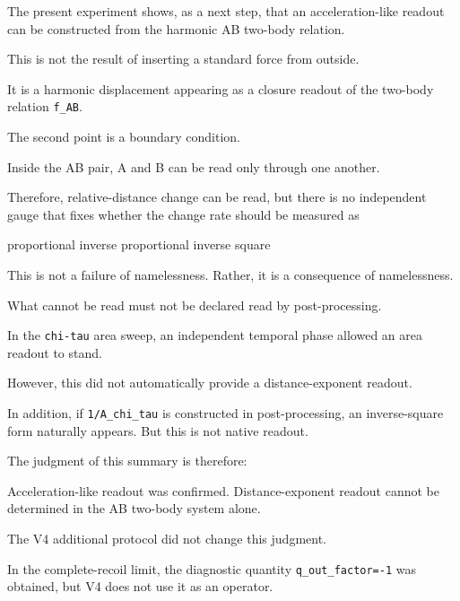 \documentclass[
]{article}
\newenvironment{Shaded}{}{}
\newcommand{\NormalTok}[1]{#1}
\begin{document}
The present experiment shows, as a next step, that an acceleration-like
readout can be constructed from the harmonic AB two-body relation.

This is not the result of inserting a standard force from outside.

It is a harmonic displacement appearing as a closure readout of the
two-body relation \texttt{f\_AB}.

The second point is a boundary condition.

Inside the AB pair, A and B can be read only through one another.

Therefore, relative-distance change can be read, but there is no
independent gauge that fixes whether the change rate should be measured
as

\begin{Shaded}
\begin{Highlighting}[]
\NormalTok{proportional}
\NormalTok{inverse proportional}
\NormalTok{inverse square}
\end{Highlighting}
\end{Shaded}

This is not a failure of namelessness. Rather, it is a consequence of
namelessness.

What cannot be read must not be declared read by post-processing.

In the \texttt{chi-tau} area sweep, an independent temporal phase
allowed an area readout to stand.

However, this did not automatically provide a distance-exponent readout.

In addition, if \texttt{1/A\_chi\_tau} is constructed in
post-processing, an inverse-square form naturally appears. But this is
not native readout.

The judgment of this summary is therefore:

\begin{Shaded}
\begin{Highlighting}[]
\NormalTok{Acceleration{-}like readout was confirmed.}
\NormalTok{Distance{-}exponent readout cannot be determined in the AB two{-}body system alone.}
\end{Highlighting}
\end{Shaded}

The V4 additional protocol did not change this judgment.

In the complete-recoil limit, the diagnostic quantity
\texttt{q\_out\_factor=-1} was obtained, but V4 does not use it as an
operator.
\end{document}

